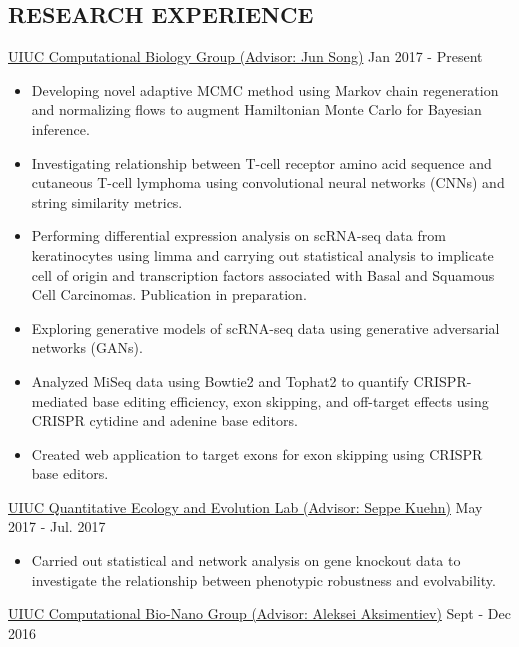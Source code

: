 \documentclass{res}
\begin{document}
\begin{resume}
\section{RESEARCH EXPERIENCE}
\vspace{2pt}
\href{http://song.igb.illinois.edu/}{UIUC Computational Biology Group (Advisor: Jun Song)}  \hfill Jan 2017 - Present
\vspace{2pt}
\begin{itemize}%
\item {\normalfont Developing novel adaptive MCMC method using Markov chain regeneration and normalizing flows to augment Hamiltonian Monte Carlo for Bayesian inference.}
\item {\normalfont Investigating relationship between T-cell receptor amino acid sequence and cutaneous T-cell lymphoma using convolutional neural networks (CNNs) and string similarity metrics.}
\item {\normalfont Performing differential expression analysis on scRNA-seq data from keratinocytes using limma and carrying out statistical analysis to implicate cell of origin and transcription factors associated with Basal and Squamous Cell Carcinomas. Publication in preparation.}
\item {\normalfont Exploring generative models of scRNA-seq data using generative adversarial networks (GANs).}
\item {\normalfont Analyzed MiSeq data using Bowtie2 and Tophat2 to quantify CRISPR-mediated base editing efficiency, exon skipping, and off-target effects using CRISPR cytidine and adenine base editors.}
\item {\normalfont Created web application to target exons  for exon skipping using CRISPR base editors.}
\end{itemize}
\href{https://www.kuehnlab.org/}{UIUC Quantitative Ecology and Evolution Lab (Advisor: Seppe Kuehn)} \hfill May 2017 - Jul. 2017
\begin{itemize}
\item {\normalfont Carried out statistical and network analysis on gene knockout data to investigate the relationship between phenotypic robustness and evolvability.}
\end{itemize}
\href{http://bionano.physics.illinois.edu/}{UIUC Computational Bio-Nano Group (Advisor: Aleksei Aksimentiev)} \hfill Sept - Dec 2016\\

\end{resume}
\end{document}
